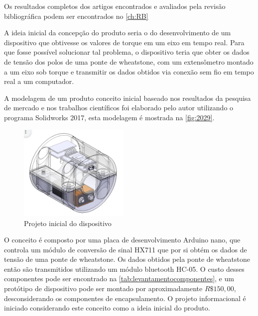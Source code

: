 Os resultados completos dos artigos encontrados e avaliados pela revisão bibliográfica podem ser encontrados no \autoref{ch:RB}

A ideia inicial da concepção do produto seria o do desenvolvimento de um dispositivo que obtivesse os valores de torque em um eixo em tempo real.
Para que fosse possível solucionar tal problema, o dispositivo teria que obter os dados de tensão dos polos de uma ponte de wheatstone, com um extensômetro montado a um eixo sob torque e transmitir os dados obtidos
via conexão sem fio em tempo real a um computador.

A modelagem de um produto conceito inicial baseado nos resultados da pesquisa de mercado e nos trabalhos científicos foi elaborado pelo autor utilizando o programa Solidworks 2017,
esta modelagem é mostrada na \autoref{fig:2029}.

\begin{figure}[htb]
	\caption{\label{fig:2029} Projeto inicial do dispositivo}
	\begin{center}
		\includegraphics[width=200]{pictures/2029.png}
	\end{center}
\end{figure}

O conceito é composto por uma placa de desenvolvimento Arduino nano, que controla um módulo de conversão de sinal HX711 que por si obtém os dados de tensão de uma ponte de wheatstone.
Os dados obtidos pela ponte de wheatstone então são transmitidos utilizando um módulo bluetooth HC-05.
O custo desses componentes pode ser encontrado na \autoref{tab:levantamentocomponentes}, e um protótipo de dispositivo pode ser montado por aproximadamente $R\$150,00$, desconsiderando os componentes de encapsulamento.
O projeto informacional é iniciado considerando este conceito como a ideia inicial do produto.

